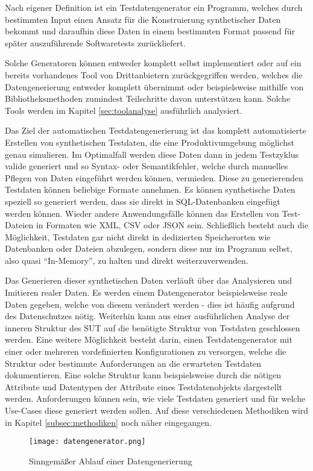 Nach eigener Definition ist ein Testdatengenerator ein Programm, welches durch bestimmten Input einen Ansatz für die Konstruierung synthetischer Daten bekommt und daraufhin diese Daten in einem bestimmten Format passend für später auszuführende Softwaretests zurückliefert.

Solche Generatoren können entweder komplett selbst implementiert oder auf ein bereits vorhandenes Tool von Drittanbietern zurückgegriffen werden, welches die Datengenerierung entweder komplett übernimmt oder beispielsweise mithilfe von Bibliotheksmethoden zumindest Teilschritte davon unterstützen kann. Solche Tools werden im Kapitel \ref{sec:toolanalyse} ausführlich analysiert.

Das Ziel der automatischen Testdatengenerierung ist das komplett automatisierte Erstellen von synthetischen Testdaten, die eine Produktivumgebung möglichst genau simulieren. Im Optimalfall werden diese Daten dann in jedem Testzyklus valide generiert und so Syntax- oder Semantikfehler, welche durch manuelles Pflegen von Daten eingeführt werden können, vermieden. Diese zu generierenden Testdaten können beliebige Formate annehmen. Es können synthetische Daten speziell so generiert werden, dass sie direkt in \ac{SQL}-Datenbanken eingefügt werden können. Wieder andere Anwendungsfälle können das Erstellen von Test-Dateien in Formaten wie \ac{XML}, \ac{CSV} oder \ac{JSON} sein. Schließlich besteht auch die Möglichkeit, Testdaten gar nicht direkt in dedizierten Speicherorten wie Datenbanken oder Dateien abzulegen, sondern diese nur im Programm selbst, also quasi \enquote{In-Memory}, zu halten und direkt weiterzuverwenden.

Das Generieren dieser synthetischen Daten verläuft über das Analysieren und Imitieren realer Daten. Es werden einem Datengenerator beispielsweise reale Daten gegeben, welche von diesem verändert werden - dies ist häufig aufgrund des Datenschutzes nötig. Weiterhin kann aus einer ausführlichen Analyse der inneren Struktur des \ac{SUT} auf die benötigte Struktur von Testdaten geschlossen werden. Eine weitere Möglichkeit besteht darin, einen Testdatengenerator mit einer oder mehreren vordefinierten Konfigurationen zu versorgen, welche die Struktur oder bestimmte Anforderungen an die erwarteten Testdaten dokumentieren. Eine solche Struktur kann beispielsweise durch die nötigen Attribute und Datentypen der Attribute eines Testdatenobjekts dargestellt werden. Anforderungen können sein, wie viele Testdaten generiert und für welche Use-Cases diese generiert werden sollen. Auf diese verschiedenen Methodiken wird in Kapitel \ref{subsec:methodiken} noch näher eingegangen.

\begin{figure}[h]
    \centering
    \texttt{[image: datengenerator.png]}
    \caption{Sinngemäßer Ablauf einer Datengenerierung}
\end{figure}